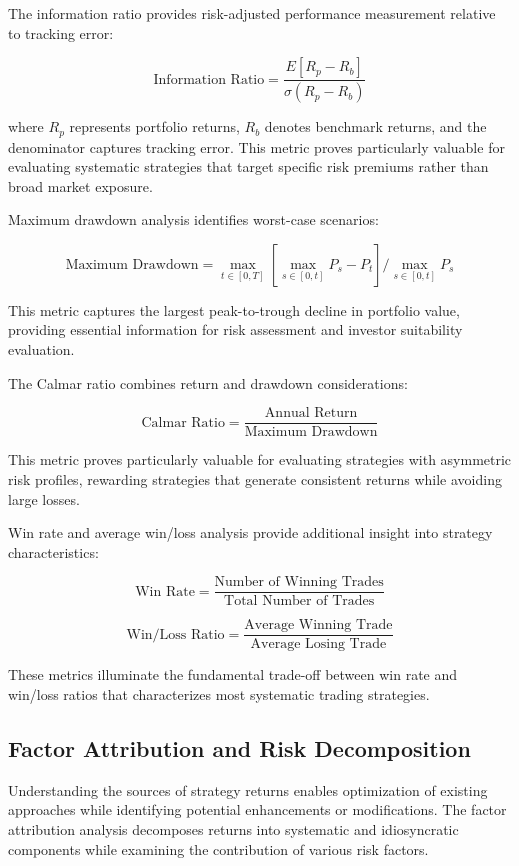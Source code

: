 \documentclass[
  american,
  11pt,
  11pt,
  letterpaper,
  onecolumn]{article}
\begin{document}
The information ratio provides risk-adjusted performance measurement
relative to tracking error:

\[\text{Information Ratio} = \frac{E[R_p - R_b]}{\sigma(R_p - R_b)}\]

where \(R_p\) represents portfolio returns, \(R_b\) denotes benchmark
returns, and the denominator captures tracking error. This metric proves
particularly valuable for evaluating systematic strategies that target
specific risk premiums rather than broad market exposure.

Maximum drawdown analysis identifies worst-case scenarios:

\[\text{Maximum Drawdown} = \max_{t \in [0,T]} \left[\max_{s \in [0,t]} P_s - P_t\right] / \max_{s \in [0,t]} P_s\]

This metric captures the largest peak-to-trough decline in portfolio
value, providing essential information for risk assessment and investor
suitability evaluation.

The Calmar ratio combines return and drawdown considerations:

\[\text{Calmar Ratio} = \frac{\text{Annual Return}}{\text{Maximum Drawdown}}\]

This metric proves particularly valuable for evaluating strategies with
asymmetric risk profiles, rewarding strategies that generate consistent
returns while avoiding large losses.

Win rate and average win/loss analysis provide additional insight into
strategy characteristics:

\[\text{Win Rate} = \frac{\text{Number of Winning Trades}}{\text{Total Number of Trades}}\]

\[\text{Win/Loss Ratio} = \frac{\text{Average Winning Trade}}{\text{Average Losing Trade}}\]

These metrics illuminate the fundamental trade-off between win rate and
win/loss ratios that characterizes most systematic trading strategies.

\subsection{Factor Attribution and Risk
Decomposition}\label{factor-attribution-and-risk-decomposition}

Understanding the sources of strategy returns enables optimization of
existing approaches while identifying potential enhancements or
modifications. The factor attribution analysis decomposes returns into
systematic and idiosyncratic components while examining the contribution
of various risk factors.
\end{document}
